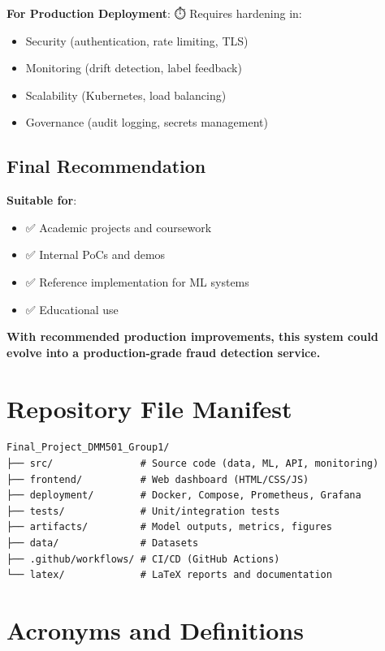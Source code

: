 \documentclass[12pt,a4paper]{article}
\begin{document}
\textbf{For Production Deployment}: ⏱️ Requires hardening in:
\begin{itemize}
    \item Security (authentication, rate limiting, TLS)
    \item Monitoring (drift detection, label feedback)
    \item Scalability (Kubernetes, load balancing)
    \item Governance (audit logging, secrets management)
\end{itemize}

\subsection{Final Recommendation}

\textbf{Suitable for}:
\begin{itemize}
    \item ✅ Academic projects and coursework
    \item ✅ Internal PoCs and demos
    \item ✅ Reference implementation for ML systems
    \item ✅ Educational use
\end{itemize}

\textbf{With recommended production improvements, this system could evolve into a production-grade fraud detection service.}

\vfill

\appendix

\section{Repository File Manifest}

\begin{lstlisting}[basicstyle=\ttfamily\tiny]
Final_Project_DMM501_Group1/
├── src/               # Source code (data, ML, API, monitoring)
├── frontend/          # Web dashboard (HTML/CSS/JS)
├── deployment/        # Docker, Compose, Prometheus, Grafana
├── tests/             # Unit/integration tests
├── artifacts/         # Model outputs, metrics, figures
├── data/              # Datasets
├── .github/workflows/ # CI/CD (GitHub Actions)
└── latex/             # LaTeX reports and documentation
\end{lstlisting}

\section{Acronyms and Definitions}
\end{document}
